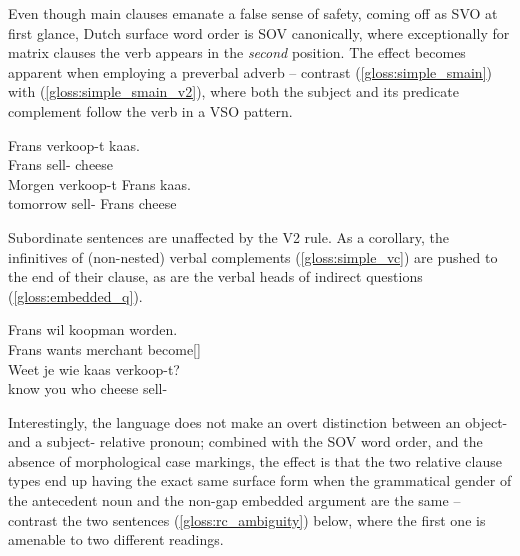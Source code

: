 Even though main clauses emanate a false sense of safety, coming off as SVO at first glance, Dutch surface word order is SOV canonically, where exceptionally for matrix clauses the verb appears in the \textit{second} position.
The effect becomes apparent when employing a preverbal adverb -- contrast (\ref{gloss:simple_smain}) with (\ref{gloss:simple_smain_v2}), where both the subject and its predicate complement follow the verb in a VSO pattern.
\begin{exe}
\ex
\begin{xlist}
\ex\label{gloss:simple_smain}
\gll Frans verkoop-t kaas.\\
Frans sell- cheese\\
\ex\label{gloss:simple_smain_v2}
\gll Morgen verkoop-t Frans kaas.\\
tomorrow sell- Frans cheese\\
\end{xlist}
\end{exe}
Subordinate sentences are unaffected by the V2 rule.
As a corollary, the infinitives of (non-nested) verbal complements (\ref{gloss:simple_vc}) are pushed to the end of their clause, as are the verbal heads of indirect questions (\ref{gloss:embedded_q}).
\begin{exe}
\ex
\begin{xlist}
\ex\label{gloss:simple_vc}
\gll Frans wil koopman worden.\\
Frans wants merchant become[]\\
\ex\label{gloss:embedded_q}
\gll Weet je wie kaas verkoop-t?\\
know you who cheese sell-\\
\end{xlist}
\end{exe}
Interestingly, the language does not make an overt distinction between an object- and a subject- relative pronoun; combined with the SOV word order, and the absence of morphological case markings, the effect is that the two relative clause types end up having the exact same surface form when the grammatical gender of the antecedent noun and the non-gap embedded argument are the same -- contrast the two sentences (\ref{gloss:rc_ambiguity}) below, where the first one is amenable to two different readings.
